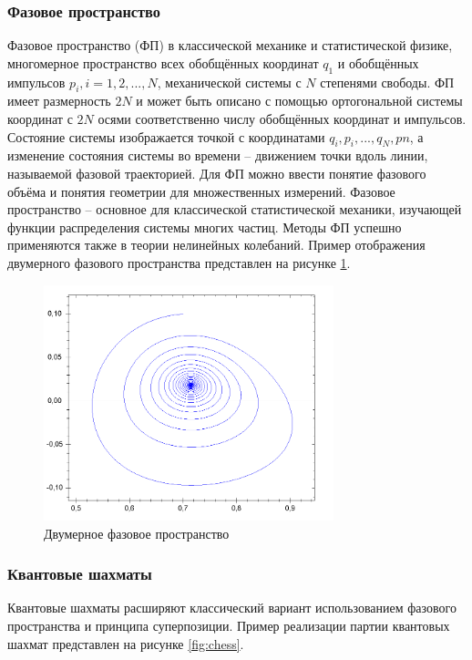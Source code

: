 \subsubsection{Фазовое пространство}

Фазовое пространство (ФП) в классической механике и статистической физике\cite{ps}, многомерное пространство всех обобщённых координат $q_1$ и обобщённых импульсов $p_i, i = 1, 2,..., N$, механической системы с $N$ степенями свободы. ФП имеет размерность $2N$ и может быть описано с помощью ортогональной системы координат с $2N$ осями соответственно числу обобщённых координат и импульсов. Состояние системы изображается точкой с координатами $q_i, p_i,..., q_N, pn$, а изменение состояния системы во времени -- движением точки вдоль линии, называемой фазовой траекторией. Для ФП можно ввести понятие фазового объёма и понятия геометрии для множественных измерений. Фазовое пространство -- основное для классической статистической механики, изучающей функции распределения системы многих частиц\cite{quantum-discrete3}. Методы ФП успешно применяются также в теории нелинейных колебаний. Пример отображения двумерного фазового пространства представлен на рисунке \ref{fig:phase2d}.

\begin{figure}[h!btp]
	\centering
	\includegraphics[width=0.75\textwidth]{inc/phase2d.png}
	\caption{Двумерное фазовое пространство}
	\label{fig:phase2d}
\end{figure}

\subsubsection{Квантовые шахматы}

Квантовые шахматы расширяют классический вариант использованием фазового пространства и принципа суперпозиции. Пример реализации партии квантовых шахмат\cite{5dchess} представлен на рисунке \ref{fig:chess}.

